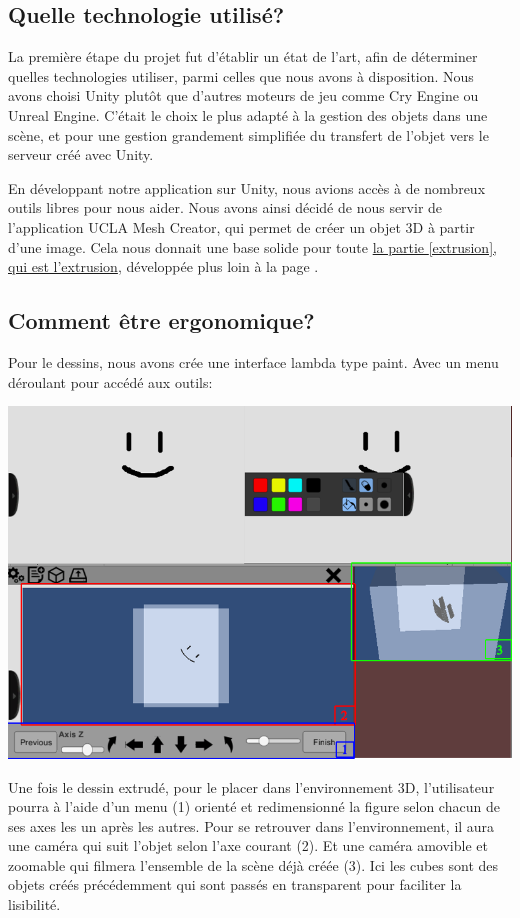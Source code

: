 \documentclass[a4paper,11pt]{article}
\begin{document}
		\subsection{Quelle technologie utilisé?}
		La première étape du projet fut d'établir un état de l'art, afin de déterminer quelles technologies utiliser, parmi celles que nous avons à disposition. Nous avons choisi Unity plutôt que d'autres moteurs de jeu comme Cry Engine ou Unreal Engine. C'était le choix le plus adapté à la gestion des objets dans une scène, et pour une gestion grandement simplifiée du transfert de l'objet vers le serveur créé avec Unity. 
		
		En développant notre application sur Unity, nous avions accès à de nombreux outils libres pour nous aider. Nous avons ainsi décidé de nous servir de l'application UCLA Mesh Creator, qui permet de créer un objet 3D à partir d'une image. Cela nous donnait une base solide pour toute \hyperlink{ancre}{la partie \ref{extrusion}, qui est l'extrusion}, développée plus loin à la page \pageref{extrusion}. 
		
		\subsection{Comment être ergonomique?}
		Pour le dessins, nous avons crée une interface lambda type paint. Avec un menu déroulant pour accédé aux outils:
		
		\centerline{\includegraphics[scale=0.5]{images/Cmt_placer.png}}
		
		Une fois le dessin extrudé, pour le placer dans l'environnement 3D, l'utilisateur pourra à l'aide d'un menu (1) orienté et redimensionné la figure selon chacun de ses axes les un après les autres. Pour se retrouver dans l'environnement, il aura une caméra qui suit l'objet selon l'axe courant (2). Et une caméra amovible et zoomable qui filmera l'ensemble de la scène déjà créée (3). Ici les cubes sont des objets créés précédemment qui sont passés en transparent pour faciliter la lisibilité.\newline\newline
\end{document}
